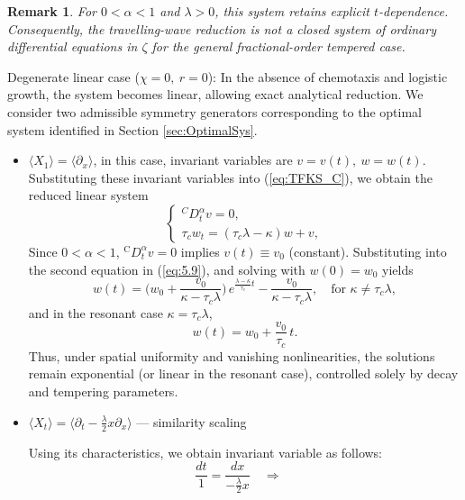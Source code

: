 \documentclass{article}
\newtheorem{remark}[theorem]{Remark}
\begin{document}
\begin{description}
\begin{itemize}
\begin{remark}
For $0<\alpha<1$ and $\lambda>0$, this system retains explicit $t$-dependence. Consequently, the travelling-wave reduction is not a closed system of ordinary differential equations in $\zeta$ for the general fractional-order tempered case.
\end{remark}
\end{itemize}
\item[\textbf{(III)}] Degenerate linear case ($\chi=0,\ r=0$):
In the absence of chemotaxis and logistic growth, the system becomes linear, allowing exact analytical reduction. We consider two admissible symmetry generators corresponding to the optimal system identified in Section \ref{sec:OptimalSys}.
\begin{itemize}
\item[\textbf{III.A)}]  $\langle X_1\rangle=\langle\partial_x\rangle$, in this case, invariant variables are $v=v(t),\ w=w(t)$. Substituting these invariant variables into (\ref{eq:TFKS_C}), we obtain the reduced linear system
\begin{equation}\label{eq:5.9}
\begin{cases}
{}^{C}D_t^{\alpha} v = 0,\\
\tau_c w_t = (\tau_c\lambda-\kappa) w + v,
\end{cases}
\end{equation}
Since $0<\alpha <1$, $^{\text{C}}D_t^{\alpha}v=0$ implies $v(t)\equiv v_0$ (constant). Substituting into the second equation in (\ref{eq:5.9}), and solving with $w(0)=w_0$ yields
\begin{equation*}
w(t)=\Big(w_0+\frac{v_0}{\kappa-\tau_c\lambda}\Big)\,e^{\frac{\lambda-\kappa}{\tau_c}t}-\frac{v_0}{\kappa-\tau_c\lambda},
\quad\text{for } \kappa\neq\tau_c\lambda,
\end{equation*}
and in the resonant case $\kappa=\tau_c\lambda$,
\begin{equation*}
w(t)=w_0+\frac{v_0}{\tau_c}\,t.
\end{equation*}
Thus, under spatial uniformity and vanishing nonlinearities, the solutions remain exponential (or linear in the resonant case), controlled solely by decay and tempering parameters.
\item[\textbf{III.B)}]  $\langle X_t\rangle=\langle \partial_t - \tfrac{\lambda}{2}x\partial_x\rangle$ — similarity scaling
\par
Using its characteristics, we obtain invariant variable as follows:
\begin{equation*}
\frac{dt}{1}=\frac{dx}{-{\frac{\lambda}{2}} x} \quad\Rightarrow\quad

\end{equation*}
\end{itemize}
\end{description}
\end{document}
